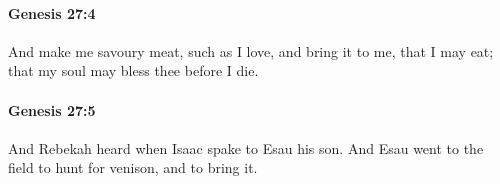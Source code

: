 		\paragraph{Genesis 27:4} %
			\label{GENESIS-27-4}

			And make me savoury meat, such as I love, and bring it to me, that I may eat; that my soul may bless thee before I die.


		\paragraph{Genesis 27:5} %
			\label{GENESIS-27-5}

			And Rebekah heard when Isaac spake to Esau his son. And Esau went to the field to hunt for venison, and to bring it.


